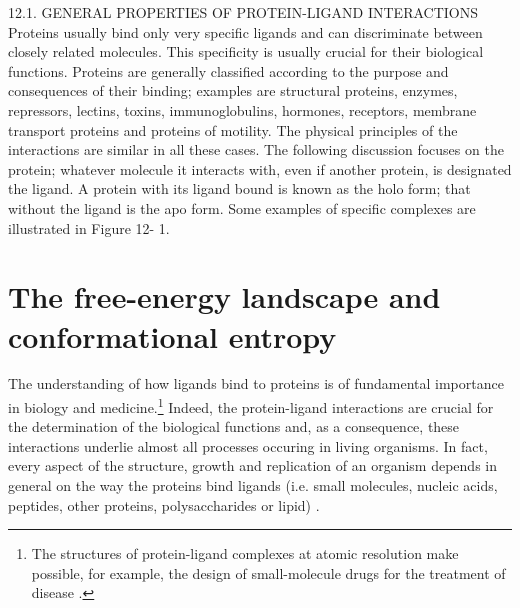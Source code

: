 12.1. GENERAL PROPERTIES OF PROTEIN-LIGAND INTERACTIONS
Proteins usually bind only very specific ligands and can discriminate between closely related
molecules. This specificity is usually crucial for their biological functions. Proteins are generally
classified according to the purpose and consequences of their binding; examples are structural
proteins, enzymes, repressors, lectins, toxins, immunoglobulins, hormones, receptors, membrane
transport proteins and proteins of motility. The physical principles of the interactions are similar in
all these cases. The following discussion focuses on the protein; whatever molecule it interacts with,
even if another protein, is designated the ligand. A protein with its ligand bound is known as the holo
form; that without the ligand is the apo form. Some examples of specific complexes are illustrated in
Figure 12- 1.
\cite{creighton2010biophysical}

\section{The free-energy landscape and conformational entropy}\label{sec:configurational-entropy}

The understanding of how ligands bind to proteins is of fundamental importance in biology and medicine.\footnote{The structures of protein-ligand complexes at atomic resolution make possible, for example, the design of small-molecule drugs for the treatment of disease \cite{dunn2001protein}.} Indeed, the protein-ligand interactions are crucial for the determination of the biological functions and, as a consequence, these interactions underlie almost all processes occuring in living organisms. In fact, every aspect of the structure, growth and replication of an organism depends in general on the way the proteins bind ligands (i.e. small molecules, nucleic acids, peptides, other proteins, polysaccharides or lipid) \cite{creighton2010biophysical}.

